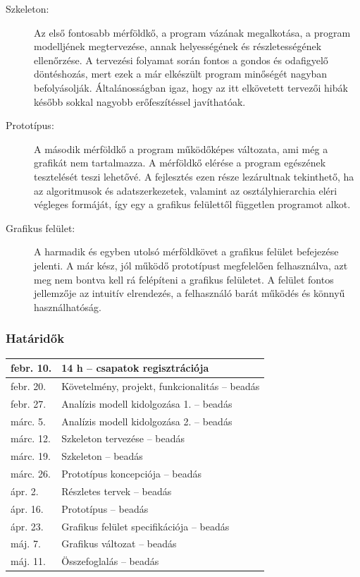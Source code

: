 	\begin{description}
		\item[Szkeleton:] Az első fontosabb mérföldkő, a program vázának megalkotása, a program modelljének megtervezése, annak helyességének és részletességének ellenőrzése. A tervezési folyamat során fontos a gondos és odafigyelő döntéshozás, mert ezek a már elkészült program minőségét nagyban befolyásolják. Általánosságban igaz, hogy az itt elkövetett tervezői hibák később sokkal nagyobb erőfeszítéssel javíthatóak.
		
		\item[Prototípus:] A második mérföldkő a program működőképes változata, ami még a grafikát nem tartalmazza. A mérföldkő elérése a program egészének tesztelését teszi lehetővé. A fejlesztés ezen része lezárultnak tekinthető, ha az algoritmusok és adatszerkezetek, valamint az osztályhierarchia eléri végleges formáját, így egy a grafikus felülettől független programot alkot.
		
		\item[Grafikus felület:] A harmadik és egyben utolsó mérföldkövet a grafikus felület befejezése jelenti. A már kész, jól működő prototípust megfelelően felhasználva, azt meg nem bontva kell rá felépíteni a grafikus felületet. A felület fontos jellemzője az intuitív elrendezés, a felhasználó barát működés és könnyű használhatóság.
	\end{description}

    \subsubsection{Határidők}
	\begin{center}
	\begin{tabular}{| l | l | }
		\hline
		febr. 10. & 14 h -- csapatok regisztrációja\\
		\hline
		febr. 20. & Követelmény, projekt, funkcionalitás -- beadás\\
		\hline
		febr. 27. & Analízis modell kidolgozása 1. -- beadás\\
		\hline
		márc. 5. & Analízis modell kidolgozása 2. -- beadás\\
		\hline
		márc. 12. & Szkeleton tervezése -- beadás\\
		\hline
		márc. 19. & Szkeleton -- beadás\\
		\hline
		márc. 26. & Prototípus koncepciója -- beadás\\
		\hline
		ápr. 2. & Részletes tervek -- beadás\\
		\hline
		ápr. 16. & Prototípus -- beadás\\
		\hline
		ápr. 23. & Grafikus felület specifikációja -- beadás\\
		\hline
		máj. 7. & Grafikus változat -- beadás\\
		\hline
		máj. 11. & Összefoglalás -- beadás\\
		\hline
	\end{tabular}
	\end{center}

